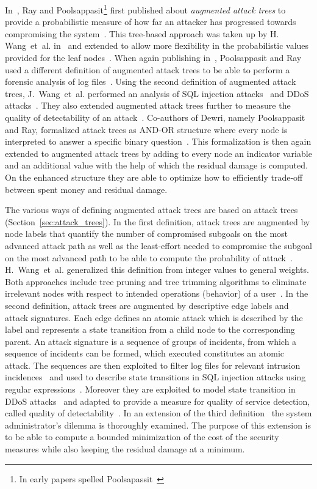 \documentclass[a4paper]{article}
\begin{document}
In~, Ray and Poolsappasit\footnote{In early papers spelled
Poolsapassit~\cite{RaPo,PoRa}} first published about \emph{augmented
attack trees} to provide a probabilistic measure of how far an
attacker has progressed towards compromising the system~\cite{RaPo}. This
tree-based approach was taken up by H. Wang~et~al. in~ and extended to
allow more flexibility in the probabilistic values provided for the leaf
nodes~\cite{WaLiZh}. When again publishing in~, Poolsappasit and Ray used
a different definition of augmented attack trees to be able to perform a
forensic analysis of log files~\cite{PoRa}. Using the second definition of
augmented attack trees, J.~Wang~et~al. performed an analysis of SQL injection
attacks~\cite{WaPhWhPa} and DDoS attacks~\cite{WaPhWhPa3}. They also extended
augmented attack trees further to measure the quality of detectability of an
attack~\cite{WaPhWhPa2}. Co-authors of Dewri, namely Poolsappasit and Ray,
formalized attack trees as AND-OR structure where every node is interpreted to
answer a specific binary question~\cite{DePoRaWh,DeRaPoWh}. This
formalization is then again extended to augmented attack trees by adding to
every node an indicator variable and an additional value with the help of
which the residual damage is computed. On the enhanced structure they are able
to optimize how to efficiently trade-off between spent money and residual
damage.

The various ways of defining augmented attack trees are based on attack trees
(Section~\ref{sec:attack_trees}). In the first definition, attack trees are
augmented by node labels that quantify the number of compromised subgoals on
the most advanced attack path as well as the least-effort needed to compromise
the subgoal on the most advanced path to be able to compute the probability of
attack~\cite{RaPo}. H.~Wang~et~al. generalized this definition from integer
values to general weights. Both approaches include tree pruning and tree
trimming algorithms to eliminate irrelevant nodes with respect to intended
operations (behavior) of a user~\cite{WaLiZh}. In the second definition,
attack trees are augmented by descriptive edge labels and attack signatures.
Each edge defines an atomic attack which is described by the label and
represents a state transition from a child node to the corresponding parent.
An attack signature is a sequence of groups of incidents, from which a sequence
of incidents can be formed, which executed constitutes an atomic attack.
The sequences are then exploited to filter log files for relevant intrusion
incidences~\cite{PoRa} and used to describe state transitions in SQL injection
attacks using regular expressions~\cite{WaPhWhPa}. Moreover they are exploited
to model state transition in DDoS attacks~\cite{WaPhWhPa3} and adapted to
provide a measure for quality of service detection, called quality of
detectability~\cite{WaPhWhPa2}. In an extension of the third
definition~\cite{DeRaPoWh} the system administrator's dilemma is thoroughly
examined. The purpose of this extension is to be able to compute a bounded
minimization of the cost of the security measures while also keeping the
residual damage at a minimum.
\end{document}
